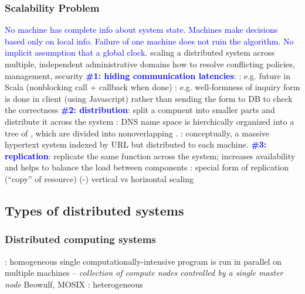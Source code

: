 \documentclass{myproc}
\begin{document}
\subsubsection{Scalability Problem}
\bit
\w {}
  \ben
  \w \textcolor{blue}{No machine has complete info about system
    state.} 
  \w \textcolor{blue}{Machines make decisions based only on local info.}
  \w \textcolor{blue}{Failure of one machine does not ruin the algorithm.}
  \w \textcolor{blue}{No implicit assumption that a global clock.}
  \een
\w scaling a distributed system across multiple, independent
administrative domains
  \bit
  \w how to resolve conflicting policies, management, security
  \eit
\w \bb{\textcolor{red}{SCALING TECHNIQUES}} 
  \bit
  \w \textcolor{blue}{\bf{}\#1: hiding communication latencies}:
    \bit
    \w {}: e.g. future in Scala (nonblocking call +
    callback when done)
    \w {}: e.g. well-formness of inquiry
    form is done in client (using Javascript) rather than sending the form to
    DB to check the correctness
    \eit
  \w \textcolor{blue}{\bf{}\#2: distribution}: split a compnent into smaller
  parts and distribute it across the system
    \bit
    \w {}: DNS name space is hierchically organized into a tree of
    , which are divided into nonoverlapping .
    \w {}: conceptually, a massive hypertext system indexed by
    URL but distributed to each machine.
    \eit
  \w \textcolor{blue}{\bf{}\#3: replication}: replicate the same function
  across the system; increases availability and helps to balance the load
  between components
    \bit
    \w {}: special form of replication (``copy'' of resource)
    \w (-) 
    \eit
  \eit
\w vertical vs horizontal scaling
\eit
\subsection{Types of distributed systems}
\subsubsection{Distributed computing systems}
\bit
\w {}: homogeneous
  \bit
  \w single computationally-intensive program is run in parallel on multiple
  machines -- {\em collection of compute nodes controlled by a single master
    node} 
  \w Beowulf, MOSIX
  \eit
\w {}: heterogeneous
  \bit
  \w 
  \eit
\eit
\end{document}
